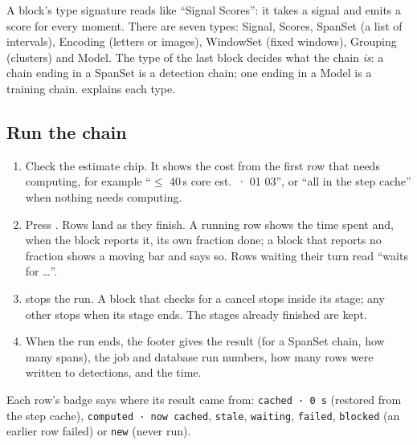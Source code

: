 
\begin{plainterms}
A block's type signature reads like ``Signal \textrightarrow{} Scores'': it takes a signal and
emits a score for every moment. There are seven types: Signal, Scores, SpanSet (a list of
intervals), Encoding (letters or images), WindowSet (fixed windows), Grouping (clusters) and
Model. The type of the last block decides what the chain \emph{is}: a chain ending in a SpanSet
is a detection chain; one ending in a Model is a training chain.  explains
each type.
\end{plainterms}

\subsection*{Run the chain}
\begin{enumerate}
  \item Check the estimate chip. It shows the cost from the first row that needs computing, for
        example ``\(\le\) 40\,s core est.\ · 01 \textrightarrow{} 03'', or ``all in the step cache''
        when nothing needs computing.
  \item Press . Rows land as they finish. A running row shows the time spent and,
        when the block reports it, its own fraction done; a block that reports no fraction shows
        a moving bar and says so. Rows waiting their turn read ``waits for \ldots''.
  \item {} stops the run. A block that checks for a cancel stops inside its stage; any
        other stops when its stage ends. The stages already finished are kept.
  \item When the run ends, the footer gives the result (for a SpanSet chain, how many spans), the
        job and database run numbers, how many rows were written to detections, and the time.
\end{enumerate}
Each row's badge says where its result came from: \texttt{cached · 0 s} (restored from the step
cache), \texttt{computed · now cached}, \texttt{stale}, \texttt{waiting}, \texttt{failed},
\texttt{blocked} (an earlier row failed) or \texttt{new} (never run).


